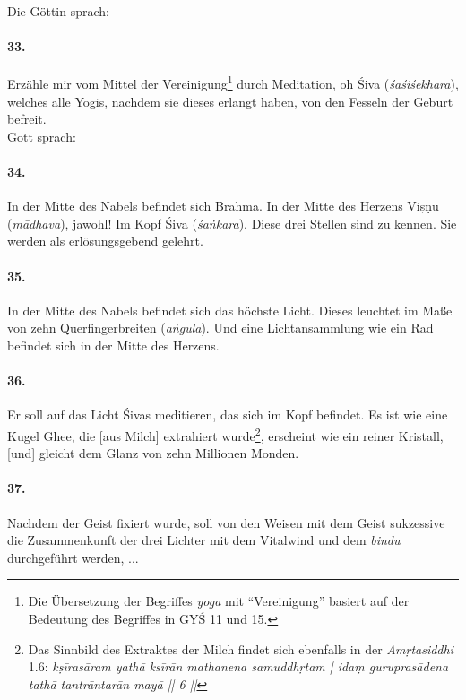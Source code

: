 \documentclass[a4paper,12pt]{article}
\begin{document}
\noindent Die Göttin sprach: 

\paragraph{33.} Erzähle mir vom Mittel der Vereinigung\footnote{Die Übersetzung der Begriffes \textit{yoga} mit ``Vereinigung'' basiert auf der Bedeutung des Begriffes in GYŚ 11 und 15.} durch Meditation, oh Śiva (\textit{śaśiśekhara}), welches alle Yogis, nachdem sie dieses erlangt haben, von den Fesseln der Geburt befreit. 
\\

\noindent Gott sprach:

\paragraph{34.} In der Mitte des Nabels befindet sich Brahmā. In der Mitte des Herzens Viṣṇu (\textit{mādhava}), jawohl! Im Kopf Śiva (\textit{śaṅkara}). Diese drei Stellen sind zu kennen. Sie werden als erlösungsgebend gelehrt. 

\paragraph{35.} In der Mitte des Nabels befindet sich das höchste Licht. Dieses leuchtet im Maße von zehn Querfingerbreiten (\textit{aṅgula}). Und eine Lichtansammlung wie ein Rad befindet sich in der Mitte des Herzens.
 
\paragraph{36.} Er soll auf das Licht Śivas meditieren, das sich im Kopf befindet. Es ist wie eine Kugel Ghee, die [aus Milch] extrahiert wurde\footnote{Das Sinnbild des Extraktes der Milch findet sich ebenfalls in der \textit{Amṛtasiddhi} 1.6: \textit{kṣīrasāram yathā ksīrān mathanena samuddhṛtam | idaṃ guruprasādena tathā tantrāntarān mayā || 6 ||}}, erscheint wie ein reiner Kristall, [und] gleicht dem Glanz von zehn Millionen Monden. 

\paragraph{37.} Nachdem der Geist fixiert wurde, soll von den Weisen mit dem Geist sukzessive die Zusammenkunft der drei Lichter mit dem Vitalwind und dem \textit{bindu} durchgeführt werden, ...
\end{document}
